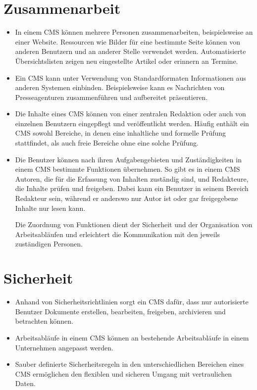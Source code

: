 \documentclass[a4paper,12pt,ngerman]{manual}
\begin{document}
\section{Zusammenarbeit}
\begin{itemize}
\item {} 
In einem CMS können mehrere Personen zusammenarbeiten, beispielsweise an
einer Website. Ressourcen wie Bilder für eine bestimmte Seite können von
anderen Benutzern und an anderer Stelle verwendet werden. Automatisierte
Übersichtslisten zeigen neu eingestellte Artikel oder erinnern an Termine.

\item {} 
Ein CMS kann unter Verwendung von Standardformaten Informationen aus
anderen Systemen einbinden. Beispielsweise kann es Nachrichten von
Presseagenturen zusammenführen und aufbereitet präsentieren.

\item {} 
Die Inhalte eines CMS können von einer zentralen Redaktion oder auch von
einzelnen Benutzern eingepflegt und veröffentlicht werden. Häufig enthält
ein CMS sowohl Bereiche, in denen eine inhaltliche und formelle Prüfung
stattfindet, als auch freie Bereiche ohne eine solche Prüfung.

\item {} 
Die Benutzer können nach ihren Aufgabengebieten und Zuständigkeiten in
einem CMS bestimmte Funktionen übernehmen. So gibt es in einem CMS Autoren,
die für die Erfassung von Inhalten zuständig sind, und Redakteure, die
Inhalte prüfen und freigeben. Dabei kann ein Benutzer in seinem Bereich
Redakteur sein, während er anderswo nur Autor ist oder gar freigegebene
Inhalte nur lesen kann.

Die Zuordnung von Funktionen dient der Sicherheit und der Organisation von
Arbeitsabläufen und erleichtert die Kommunikation mit den jeweils
zuständigen Personen.

\end{itemize}


\section{Sicherheit}
\begin{itemize}
\item {} 
Anhand von Sicherheitsrichtlinien sorgt ein
CMS dafür, dass nur autorisierte Benutzer Dokumente
erstellen, bearbeiten, freigeben, archivieren und betrachten können.

\item {} 
Arbeitsabläufe in einem CMS können an bestehende Arbeitsabläufe in einem
Unternehmen angepasst werden.

\item {} 
Sauber definierte Sicherheitsregeln in den unterschiedlichen Bereichen
eines CMS ermöglichen den flexiblen und sicheren Umgang mit vertraulichen
Daten.

\end{itemize}
\end{document}
